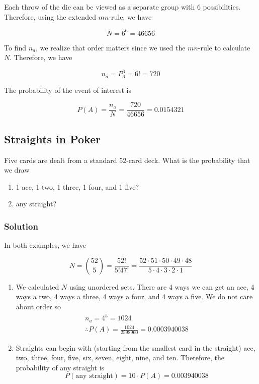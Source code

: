 \documentclass[11pt]{article}
\theoremstyle{definition}
\begin{document}
Each throw of the die can be viewed as a separate group with 6 possibilities. Therefore, using the extended $mn$-rule, we have

$$
	N = 6^6 = 46656
$$

To find $n_a$, we realize that order matters since we used the $mn$-rule to calculate $N$. Therefore, we have

$$
	n_a = P^6_6 = 6! = 720
$$

The probability of the event of interest is

$$
	P(A) = \frac{n_a}{N} = \frac{720}{46656} = 0.0154321
$$

\subsection{Straights in Poker}

Five cards are dealt from a standard 52-card deck. What is the probability that we draw

\begin{enumerate}
	\item 1 ace, 1 two, 1 three, 1 four, and 1 five?
	\item any straight?
\end{enumerate}

\subsubsection*{Solution}

In both examples, we have

$$
	N = {52 \choose 5} = \frac{52!}{5!47!} = \frac{52\cdot51\cdot50\cdot49\cdot48}{5\cdot4\cdot3\cdot2\cdot1}
$$

\begin{enumerate}
	\item We calculated $N$ using unordered sets. There are 4 ways we can get an ace, 4 ways a two, 4 ways a three, 4 ways a four, and 4 ways a five. We do not care about order so
	$$
		\begin{aligned}
			n_a = 4^5 = 1024 \\
			\therefore P(A) = \frac{1024}{2598960} = 0.0003940038
		\end{aligned}
	$$
	\item Straights can begin with (starting from the smallest card in the straight) ace, two, three, four, five, six, seven, eight, nine, and ten. Therefore, the probability of any straight is
	$$
		P(\text{any straight}) = 10 \cdot P(A) = 0.003940038
	$$
\end{enumerate}
\end{document}

